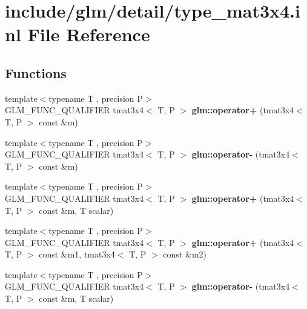 \hypertarget{type__mat3x4_8inl}{}\section{include/glm/detail/type\+\_\+mat3x4.inl File Reference}
\label{type__mat3x4_8inl}
\subsection*{Functions}
\begin{DoxyCompactItemize}
\item 
\mbox{\label{type__mat3x4_8inl_a22ac402749dde369e329512ca3b12bc7}} 
{\footnotesize template$<$typename T , precision P$>$ }\\G\+L\+M\+\_\+\+F\+U\+N\+C\+\_\+\+Q\+U\+A\+L\+I\+F\+I\+ER tmat3x4$<$ T, P $>$ {\bfseries glm\+::operator+} (tmat3x4$<$ T, P $>$ const \&m)
\item 
\mbox{\label{type__mat3x4_8inl_a1322505211ba57518d78489694f2a16c}} 
{\footnotesize template$<$typename T , precision P$>$ }\\G\+L\+M\+\_\+\+F\+U\+N\+C\+\_\+\+Q\+U\+A\+L\+I\+F\+I\+ER tmat3x4$<$ T, P $>$ {\bfseries glm\+::operator-\/} (tmat3x4$<$ T, P $>$ const \&m)
\item 
\mbox{\label{type__mat3x4_8inl_a4dac54fa891bb6fb3bc975c094249bfa}} 
{\footnotesize template$<$typename T , precision P$>$ }\\G\+L\+M\+\_\+\+F\+U\+N\+C\+\_\+\+Q\+U\+A\+L\+I\+F\+I\+ER tmat3x4$<$ T, P $>$ {\bfseries glm\+::operator+} (tmat3x4$<$ T, P $>$ const \&m, T scalar)
\item 
\mbox{\label{type__mat3x4_8inl_a561a98c191b0a0dd371b7a076cda269d}} 
{\footnotesize template$<$typename T , precision P$>$ }\\G\+L\+M\+\_\+\+F\+U\+N\+C\+\_\+\+Q\+U\+A\+L\+I\+F\+I\+ER tmat3x4$<$ T, P $>$ {\bfseries glm\+::operator+} (tmat3x4$<$ T, P $>$ const \&m1, tmat3x4$<$ T, P $>$ const \&m2)
\item 
\mbox{\label{type__mat3x4_8inl_a5e302113e47a053aebb48f1cd832643e}} 
{\footnotesize template$<$typename T , precision P$>$ }\\G\+L\+M\+\_\+\+F\+U\+N\+C\+\_\+\+Q\+U\+A\+L\+I\+F\+I\+ER tmat3x4$<$ T, P $>$ {\bfseries glm\+::operator-\/} (tmat3x4$<$ T, P $>$ const \&m, T scalar)

\end{DoxyCompactItemize}
